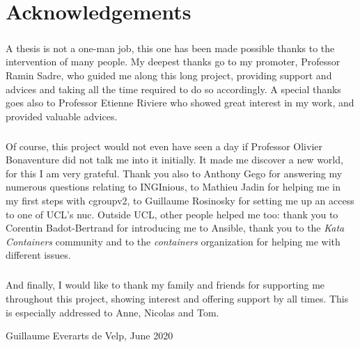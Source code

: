 \chapter*{Acknowledgements}

\paragraph{}A thesis is not a one-man job, this one has been made possible thanks to the intervention of many people.  My deepest thanks go to my promoter, Professor Ramin Sadre, who guided me along this long project, providing support and advices and taking all the time required to do so accordingly.  A special thanks goes also to Professor Etienne Riviere who showed great interest in my work, and provided valuable advices.

\paragraph{}Of course, this project would not even have seen a day if Professor Olivier Bonaventure did not talk me into it initially. It made me discover a new world, for this I am very grateful.  Thank you also to Anthony Gego for answering my numerous questions relating to INGInious, to Mathieu Jadin for helping me in my first steps with cgroupv2, to Guillaume Rosinosky for setting me up an access to one of UCL's nuc.  Outside UCL, other people helped me too: thank you to Corentin Badot-Bertrand for introducing me to Ansible, thank you to the \textit{Kata Containers} community and to the \textit{containers} organization for helping me with different issues.

\paragraph{}And finally, I would like to thank my family and friends for supporting me throughout this project, showing interest and offering support by all times.  This is especially addressed to Anne, Nicolas and Tom.

\begin{flushright}
  Guillaume Everarts de Velp, June 2020
\end{flushright}

